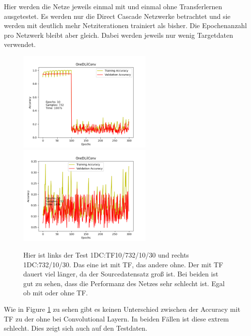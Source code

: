 Hier werden die Netze jeweils einmal mit und einmal ohne Transferlernen ausgetestet. Es werden nur die Direct Cascade Netzwerke betrachtet und 
sie werden mit deutlich mehr Netziterationen trainiert als bisher. Die Epochenanzahl pro Netzwerk bleibt aber gleich. Dabei werden jeweils nur 
wenig Targetdaten verwendet. 

\begin{figure}[htpb]
    \includegraphics[height=5cm]{../../Plots/ba_plots/classTF/1dc_tr.png}
    \includegraphics[height=5cm]{../../Plots/ba_plots/classTF/wo1dc_tr.png}
    \caption{\label{fig:1dc_tr} 
    \small{Hier ist links der Test 1DC:TF10/732/10/30 und rechts 1DC:732/10/30. Das eine ist mit TF, das andere ohne. Der mit TF dauert viel länger, 
    da der Sourcedatensatz groß ist. Bei beiden ist gut zu sehen, dass die Performanz des Netzes sehr schlecht ist. Egal ob mit oder ohne TF.}}
\end{figure}

Wie in Figure \ref{fig:1dc_tr} zu sehen gibt es keinen Unterschied zwischen der Accuracy mit TF zu der ohne bei Convolutional Layern. In beiden Fällen ist diese 
extrem schlecht. Dies zeigt sich auch auf den Testdaten. 

